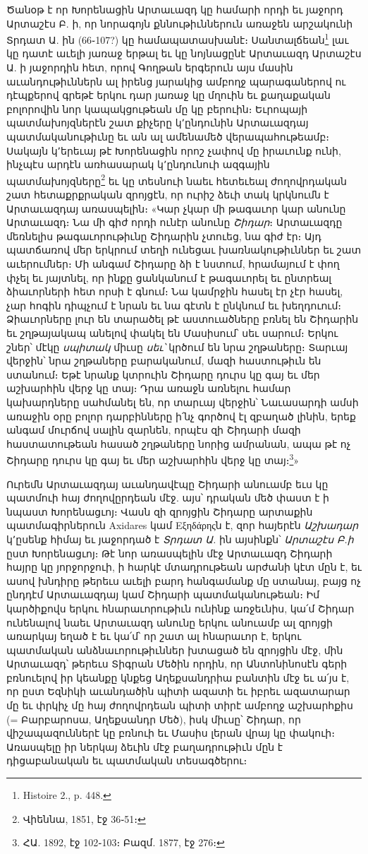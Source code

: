\documentclass{article}
\begin{document}
{Ծանօթ է որ Խորենացին Արտաւազդ կը համարի որդի եւ յաջորդ Արտաշէս Բ. ի, որ նորագոյն քննութիւններուն առաջեն արշակունի Տրդատ Ա. ին (66֊107?) կը համապատասխանէ։ Սանտալճեան\footnote{Histoire 2., p. 448.} լաւ կը դատէ աւելի յառաջ երթալ եւ կը նոյնացընէ Արտաւազդ Արտաշէս Ա. ի յաջորդին հետ, որով Գողթան երգերուն այս մասին աւանդութիւններն ալ իրենց յարակից ամբողջ պարագաներով ու դէպքերով գրեթէ երկու դար յառաջ կը մղուին եւ քաղաքական բոլորովին նոր կապակցութեան մը կը բերուին։ Եւրոպայի պատմախոյզներէն շատ քիչերը կ՚ընդունին Արտաւազդայ պատմականութիւնը եւ ան ալ ամենամեծ վերապահութեամբ։ Սակայն կ՚երեւայ թէ Խորենացին որոշ չափով մը իրաւունք ունի, ինչպէս արդէն առհասարակ կ՚ընդունուի ազգային պատմախոյզները\footnote{Վիեննա, 1851, էջ 36֊51։} եւ կը տեսնուի նաեւ հետեւեալ ժողովրդական շատ հետաքրքրական զրոյցէն, որ ուրիշ ձեւի տակ կրկնումն է Արտաւազդայ առասպելին։ «Կար չկար մի թագաւոր կար անունը Արտաւազդ։ Նա մի գիժ որդի ունէր անունը \emph{Շիդար}։ Արտաւազդը մեռնելիս թագաւորութիւնը Շիդարին չտուեց, նա գիժ էր։ Այդ պատճառով մեր երկրում տեղի ունեցաւ խառնակութիւններ եւ շատ աւերումներ։ Մի անգամ Շիդարը ձի է նստում, հրամայում է փող փչել եւ յայտնել, որ ինքը ցանկանում է թագաւորել եւ ընտրեալ ձիաւորների հետ որսի է գնում։ Նա կամրջին հասել էր չէր հասել, չար հոգին դիպչում է նրան եւ նա գէտն է ընկնում եւ խեղդուում։ Ձիաւորները լուր են տարածել թէ աստուածները բռնել են Շիդարին եւ շղթայակապ անելով փակել են Մասիսում՝ սեւ սարում։ Երկու շներ՝ մէկը \emph{սպիտակ} միւսը \emph{սեւ՝} կրծում են նրա շղթաները։ Տարւայ վերջին՝ նրա շղթաները բարականում, մազի հաստութիւն են ստանում։ Եթէ նրանք կտրուին Շիդարը դուրս կը գայ եւ մեր աշխարհին վերջ կը տայ։ Դրա առաջն առնելու համար կախարդները սահմանել են, որ տարւայ վերջին՝ Նաւասարդի ամսի առաջին օրը բոլոր դարբինները ի՛նչ գործով էլ զբաղած լինին, երեք անգամ մուրճով սալին զարնեն, որպէս զի Շիդարի մազի հաստատութեան հասած շղթաները նորից ամրանան, ապա թէ ոչ Շիդարը դուրս կը գայ եւ մեր աշխարհին վերջ կը տայ։\footnote{ՀԱ. 1892, էջ 102֊103։ Բազմ. 1877, էջ 276։}»

Ուրեմն Արտաւազդայ աւանդավէպը Շիդարի անուամբ եւս կը պատմուի հայ ժողովըրդեան մէջ. այս՝ դրական մեծ փաստ է ի նպաստ Խորենացւոյ։ Վասն զի զրոյցին Շիդարը արտաքին պատմագիրներուն Axidares կամ Εξηδάρηςն է, զոր հայերէն \emph{Աշխադար} կ՚ըսենք հիմայ եւ յաջորդած է \emph{Տրդատ Ա.} ին այսինքն՝ \emph{Արտաշէս Բ.ի} ըստ Խորենացւոյ։ Թէ նոր առասպելին մէջ Արտաւազդ Շիդարի հայրը կը յորջորջուի, ի հարկէ մտադրութեան արժանի կէտ մըն է, եւ ասով խնդիրը թերեւս աւելի բարդ հանգամանք մը ստանայ, բայց ոչ ընդդէմ Արտաւազդայ կամ Շիդարի պատմականութեան։ Իմ կարծիքովս երկու հնարաւորութիւն ունինք առջեւնիս, կա՛մ Շիդար ունենալով նաեւ Արտաւազդ անունը երկու անուամբ ալ զրոյցի առարկայ եղած է եւ կա՛մ՝ որ շատ ալ հնարաւոր է, երկու պատմական անձնաւորութիւններ խտացած են զրոյցին մէջ, մին Արտաւազդ՝ թերեւս Տիգրան Մեծին որդին, որ Անտոնինոսէն գերի բռնուելով իր կեանքը կնքեց Աղեքսանդրիա բանտին մէջ եւ ա՛յս է, որ ըստ Եզնիկի աւանդածին պիտի ազատի եւ իբրեւ ազատարար մը եւ փրկիչ մը հայ ժողովրդեան պիտի տիրէ ամբողջ աշխարհքիս (= Բարբարոսա, Աղեքսանդր Մեծ), իսկ միւսը՝ Շիդար, որ վիշապազուններէ կը բռնուի եւ Մասիս լերան վրայ կը փակուի։ Առասպելը իր ներկայ ձեւին մէջ բաղադրութիւն մըն է դիցաբանական եւ պատմական տեսագծերու։

}
\end{document}
